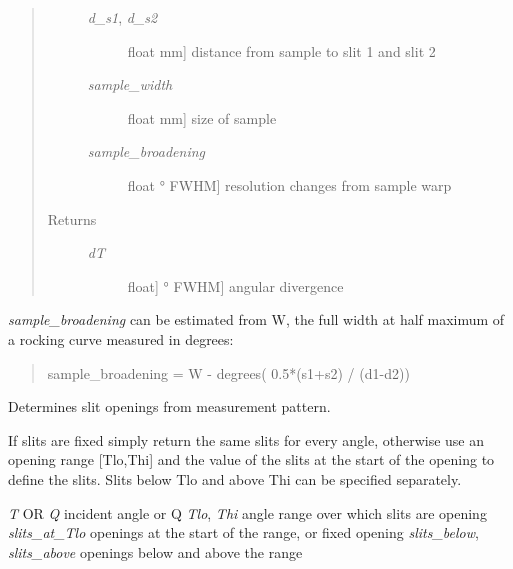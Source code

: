 \documentclass[letterpaper,10pt,english]{sphinxmanual}
\begin{document}
\begin{fulllineitems}
\begin{fulllineitems}
\begin{quote}
\begin{description}
\begin{description}
\item[{\emph{d\_s1}, \emph{d\_s2}}] \leavevmode{[}float \textbar{} mm{]}
distance from sample to slit 1 and slit 2

\item[{\emph{sample\_width}}] \leavevmode{[}float \textbar{} mm{]}
size of sample

\item[{\emph{sample\_broadening}}] \leavevmode{[}float \textbar{} ° FWHM{]}
resolution changes from sample warp

\end{description}

\item[{Returns }] \leavevmode\begin{description}
\item[{\emph{dT}}] \leavevmode{[}{[}float{]} \textbar{} ° FWHM{]}
angular divergence

\end{description}

\end{description}\end{quote}

\emph{sample\_broadening} can be estimated from W, the full width at half
maximum of a rocking curve measured in degrees:
\begin{quote}

sample\_broadening = W - degrees( 0.5*(s1+s2) / (d1-d2))
\end{quote}

\end{fulllineitems}


\begin{fulllineitems}
\label{api/ncnrdata:refl1d.ncnrdata.XRay.calc_slits}
Determines slit openings from measurement pattern.

If slits are fixed simply return the same slits for every angle,
otherwise use an opening range {[}Tlo,Thi{]} and the value of the
slits at the start of the opening to define the slits.  Slits
below Tlo and above Thi can be specified separately.

\emph{T} OR \emph{Q}       incident angle or Q
\emph{Tlo}, \emph{Thi}     angle range over which slits are opening
\emph{slits\_at\_Tlo}   openings at the start of the range, or fixed opening
\emph{slits\_below}, \emph{slits\_above}   openings below and above the range


\end{fulllineitems}
\end{fulllineitems}
\end{document}
